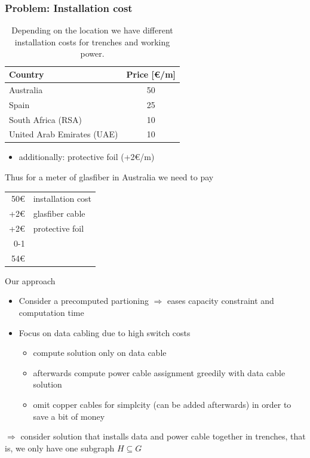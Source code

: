 \begin{frame}\frametitle{Problem: Installation cost}
\begin{table}
  \caption{Depending on the location we have different installation costs for trenches and working power.}
  \begin{tabular}{l|c}
    Country & Price [\euro/m] \\
    \toprule
    Australia & 50 \\
    Spain & 25 \\
    South Africa (RSA) & 10 \\
    United Arab Emirates (UAE) & 10
  \end{tabular}
\end{table}
\begin{itemize}
  \item additionally: protective foil (+2\euro/m)
\end{itemize}
Thus for a meter of glasfiber in Australia we need to pay
\begin{tabular}{rl}
  \phantom{+}50\euro & installation cost \\
  +2\euro & glasfiber cable \\
  +2\euro & protective foil \\
  \cmidrule{0-1} \\
  54\euro
\end{tabular}
\end{frame}

\begin{frame}[t]{Our approach}
\vfill
\begin{itemize}
  \item Consider a precomputed partioning $\Rightarrow$ eases capacity constraint and computation time
  \item Focus on data cabling due to high switch costs
  \begin{itemize}
    \item compute solution only on data cable
    \item afterwards compute power cable assignment greedily with data cable solution
    \item omit copper cables for simplcity (can be added afterwards) in order to save a bit of money
  \end{itemize}
  \end{itemize}
$\Rightarrow$ consider solution that installs data and power cable together in trenches, that is, we only have one subgraph $H\subseteq G$
\vfill
\end{frame}

